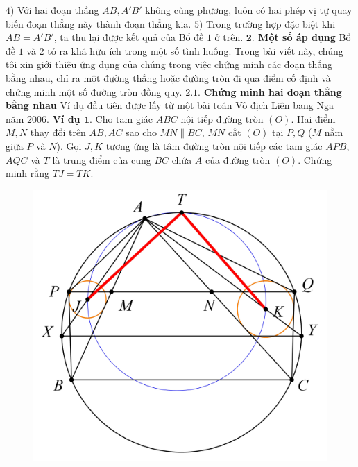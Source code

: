 \begin{multicols}{2}
\begin{figure}[H]
		\vspace*{-10pt}
	\end{figure}
	$4)$ Với hai đoạn thẳng $AB,A'B'$ không cùng phương, luôn có hai phép vị tự quay biến đoạn thẳng này thành đoạn thẳng kia.
	\vskip 0.1cm
	$5)$ Trong trường hợp đặc biệt khi $AB=A'B'$, ta thu lại được kết quả của Bổ đề $1$ ở trên.
	\vskip 0.1cm
	\textbf{\color{hoccungpi}$\pmb{2.}$  Một số áp dụng}
	\vskip 0.1cm
	Bổ đề $1$ và $2$ tỏ ra khá hữu ích trong một số tình huống. Trong bài viết này, chúng tôi xin giới thiệu ứng dụng của chúng trong việc chứng minh các đoạn thẳng bằng nhau, chỉ ra một đường thẳng hoặc đường tròn đi qua điểm cố định và chứng minh một số đường tròn đồng quy.
	\vskip 0.1cm
	$\pmb{2.1.}$ \textbf{\color{hoccungpi}Chứng minh hai đoạn thẳng bằng nhau}
	\vskip 0.1cm
	Ví dụ đầu tiên được lấy từ một bài toán Vô địch Liên bang Nga năm $2006$.
	\vskip 0.1cm
	\textbf{\color{hoccungpi}Ví dụ $\pmb{1.}$} Cho tam giác $ABC$ nội tiếp đường tròn $(O)$. Hai điểm $M,N$ thay đổi trên $AB,AC$ sao cho $MN \parallel BC$, $MN$ cắt $(O)$ tại  $P,Q$ ($M$ nằm giữa $P$ và $N$). Gọi $J,K$ tương ứng là tâm đường tròn nội tiếp các tam giác $APB$, $AQC$ và $T$ là trung điểm của cung $BC$ chứa $A$ của đường tròn $(O)$. Chứng minh rằng $TJ=TK$.
	\begin{figure}[H]
		\vspace*{-5pt}
		\centering
		\captionsetup{labelformat= empty, justification=centering}
		\includegraphics[width= 0.9\linewidth]{4}
		\vspace*{-10pt}
	\end{figure}

\end{multicols}
